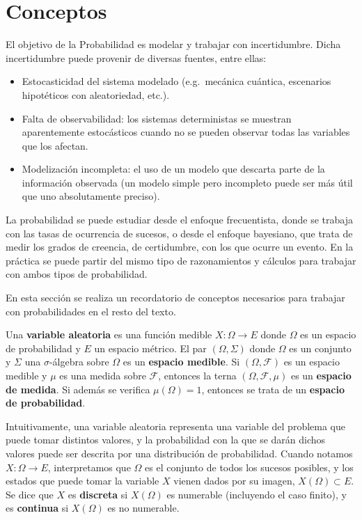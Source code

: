\section{Conceptos}\label{conceptos}

El objetivo de la Probabilidad es modelar y trabajar con incertidumbre.
Dicha incertidumbre puede provenir de diversas fuentes, entre ellas:

\begin{itemize}
\tightlist
\item
  Estocasticidad del sistema modelado (e.g.~mecánica cuántica,
  escenarios hipotéticos con aleatoriedad, etc.).
\item
  Falta de observabilidad: los sistemas deterministas se muestran
  aparentemente estocásticos cuando no se pueden observar todas las
  variables que los afectan.
\item
  Modelización incompleta: el uso de un modelo que descarta parte de la
  información observada (un modelo simple pero incompleto puede ser más
  útil que uno absolutamente preciso).
\end{itemize}

La probabilidad se puede estudiar desde el enfoque frecuentista, donde
se trabaja con las tasas de ocurrencia de sucesos, o desde el enfoque
bayesiano, que trata de medir los grados de creencia, de certidumbre,
con los que ocurre un evento. En la práctica se puede partir del mismo
tipo de razonamientos y cálculos para trabajar con ambos tipos de
probabilidad.

En esta sección se realiza un recordatorio de conceptos necesarios para
trabajar con probabilidades en el resto del texto.

Una \textbf{variable aleatoria} es una función medible
\(X:\Omega\rightarrow E\) donde \(\Omega\) es un espacio de probabilidad
y \(E\) un espacio métrico. 
{}
El par \((\Omega, \Sigma)\) donde \(\Omega\) es un conjunto y \(\Sigma\)
una \(\sigma\)-álgebra sobre \(\Omega\) es un \textbf{espacio medible}.
{}
Si \((\Omega, \mathcal{F})\) es un espacio medible y \(\mu\) es una
medida sobre \(\mathcal{F}\), entonces la terna
\((\Omega, \mathcal{F}, \mu)\) es un \textbf{espacio de medida}. Si
además se verifica \(\mu(\Omega)=1\), entonces se trata de un
\textbf{espacio de probabilidad}. 

Intuitivamente, una variable aleatoria representa una variable del
problema que puede tomar distintos valores, y la probabilidad con la que
se darán dichos valores puede ser descrita por una distribución de
probabilidad. Cuando notamos \(X:\Omega\rightarrow E\), interpretamos
que \(\Omega\) es el conjunto de todos los sucesos posibles, y los
estados que puede tomar la variable \(X\) vienen dados por su imagen,
\(X(\Omega)\subset E\). Se dice que \(X\) es \textbf{discreta} si
\(X(\Omega)\) es numerable (incluyendo el caso finito), y es
\textbf{continua} si \(X(\Omega)\) es no numerable.

